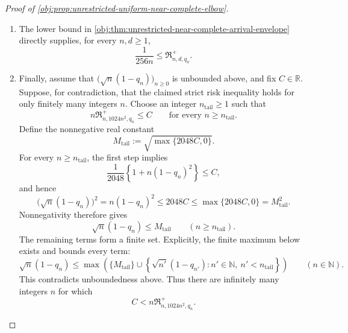 \documentclass[11pt]{article}
\begin{document}
\begin{proof}[Proof of \cref{obj:prop:unrestricted-uniform-near-complete-elbow}]
\begin{enumerate}
\item The lower bound in \cref{obj:thm:unrestricted-near-complete-arrival-envelope} directly supplies, for every \(n,d\ge1\),
\[
\frac1{256n}\le\mathfrak R^{+}_{n,d,q_n}.
\]

\item Finally, assume that \(\bigl(\sqrt n(1-q_n)\bigr)_{n\ge0}\) is unbounded above, and fix \(C\in\mathbb R\). Suppose, for contradiction, that the claimed strict risk inequality holds for only finitely many integers \(n\). Choose an integer \(n_{\mathrm{tail}}\ge1\) such that
\[
n\mathfrak R^{+}_{n,1024n^2,q_n}\le C
\qquad\text{for every }n\ge n_{\mathrm{tail}}.
\]
Define the nonnegative real constant
\[
M_{\mathrm{tail}}:=\sqrt{\max\{2048C,0\}}.
\]
For every \(n\ge n_{\mathrm{tail}}\), the first step implies
\[
\frac1{2048}\left\{1+n(1-q_n)^2\right\}\le C,
\]
and hence
\[
\bigl(\sqrt n(1-q_n)\bigr)^2
=n(1-q_n)^2
\le2048C
\le\max\{2048C,0\}
=M_{\mathrm{tail}}^2.
\]
Nonnegativity therefore gives
\[
\sqrt n(1-q_n)\le M_{\mathrm{tail}}
\qquad(n\ge n_{\mathrm{tail}}).
\]
The remaining terms form a finite set. Explicitly, the finite maximum below exists and bounds every term:
\[
\sqrt n(1-q_n)
\le
\max\left(
\{M_{\mathrm{tail}}\}
\cup
\left\{\sqrt{n'}(1-q_{n'}):
n'\in\mathbb N,\ n'<n_{\mathrm{tail}}\right\}
\right)
\qquad(n\in\mathbb N).
\]
This contradicts unboundedness above. Thus there are infinitely many integers \(n\) for which
\[
C<n\mathfrak R^{+}_{n,1024n^2,q_n}.
\]
\end{enumerate}
\end{proof}
\end{document}
